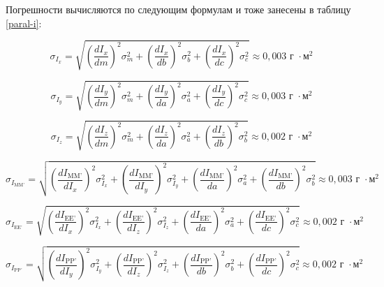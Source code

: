 \documentclass[a4paper,12pt]{article}
\begin{document}
Погрешности вычисляются по следующим формулам и тоже занесены в таблицу \ref{paral-i}:

\begin{equation}
    \sigma_{I_{x}} = \sqrt{
    \left( \frac{dI_{x}}{dm} \right)^2 \sigma_{m}^2 + 
    \left( \frac{dI_{x}}{db} \right)^2 \sigma_{b}^2 + 
    \left( \frac{dI_{x}}{dc} \right)^2 \sigma_{c}^2
    } \approx 0,003 \text{ г } \cdot \text{м}^2
\end{equation}

\begin{equation}
    \sigma_{I_{y}} = \sqrt{
    \left( \frac{dI_{y}}{dm} \right)^2 \sigma_{m}^2 + 
    \left( \frac{dI_{y}}{da} \right)^2 \sigma_{a}^2 + 
    \left( \frac{dI_{y}}{dc} \right)^2 \sigma_{c}^2
    } \approx 0,003 \text{ г } \cdot \text{м}^2
\end{equation}

\begin{equation}
    \sigma_{I_{z}} = \sqrt{
    \left( \frac{dI_{z}}{dm} \right)^2 \sigma_{m}^2 + 
    \left( \frac{dI_{z}}{da} \right)^2 \sigma_{a}^2 + 
    \left( \frac{dI_{z}}{db} \right)^2 \sigma_{b}^2
    } \approx 0,002 \text{ г } \cdot \text{м}^2
\end{equation}

\begin{equation}
    \sigma_{I_{\text{MM'}}} = \sqrt{
    \left( \frac{dI_{\text{MM'}}}{dI_{x}} \right)^2 \sigma_{I_{x}}^2 + 
    \left( \frac{dI_{\text{MM'}}}{dI_{y}} \right)^2 \sigma_{I_{y}}^2 + 
    \left( \frac{dI_{\text{MM'}}}{da} \right)^2 \sigma_{a}^2 + 
    \left( \frac{dI_{\text{MM'}}}{db} \right)^2 \sigma_{b}^2
    } \approx 0,003 \text{ г } \cdot \text{м}^2
\end{equation}

\begin{equation}
    \sigma_{I_{\text{EE'}}} = \sqrt{
    \left( \frac{dI_{\text{EE'}}}{dI_{x}} \right)^2 \sigma_{I_{x}}^2 + 
    \left( \frac{dI_{\text{EE'}}}{dI_{z}} \right)^2 \sigma_{I_{z}}^2 + 
    \left( \frac{dI_{\text{EE'}}}{da} \right)^2 \sigma_{a}^2 + 
    \left( \frac{dI_{\text{EE'}}}{dc} \right)^2 \sigma_{c}^2
    } \approx 0,002 \text{ г } \cdot \text{м}^2
\end{equation}

\begin{equation}
    \sigma_{I_{\text{PP'}}} = \sqrt{
    \left( \frac{dI_{\text{PP'}}}{dI_{y}} \right)^2 \sigma_{I_{y}}^2 + 
    \left( \frac{dI_{\text{PP'}}}{dI_{z}} \right)^2 \sigma_{I_{z}}^2 + 
    \left( \frac{dI_{\text{PP'}}}{db} \right)^2 \sigma_{b}^2 + 
    \left( \frac{dI_{\text{PP'}}}{dc} \right)^2 \sigma_{c}^2
    } \approx 0,002 \text{ г } \cdot \text{м}^2
\end{equation}
\end{document}
